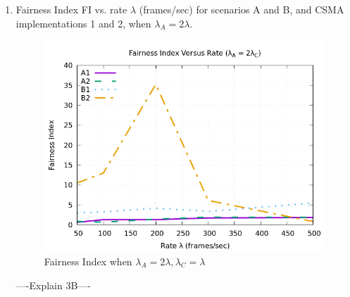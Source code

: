 \documentclass[12pt]{article}
\begin{document}
\begin{enumerate}
    
\clearpage  
        \item {
            Fairness Index FI vs. rate \(\lambda{}\) (frames/sec) for scenarios A and B, and CSMA implementations 1 and 2, when \(\lambda{}_A = 2\lambda{}\).
            
            \begin{figure}[!htb]
                \centering
                \includegraphics[width=5in]{3B.png}
                \caption{Fairness Index when \(\lambda{}_A = 2\lambda{}, \lambda{}_C = \lambda{}\) }
                \label{fig:3B}
            \end{figure}

            ----Explain 3B----
        }    
    \end{enumerate}
\end{document}
